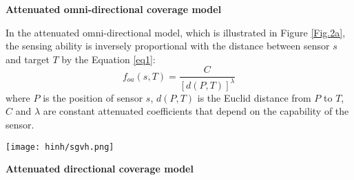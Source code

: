 \documentclass[final]{elsarticle}
\begin{document}
\noindent\textbf{Attenuated omni-directional coverage model}

In the attenuated omni-directional model, which is illustrated in Figure \ref{Fig.2a}, the sensing ability is inversely proportional with the distance between sensor $ s $ and target $ T $ by the Equation \ref{eq1}:
\begin{equation}
\label{eq1}
f_{oa}({s},T) = \frac{C}{{{{\left[ {d(P,T)} \right]}^\lambda }}}
\end{equation}
where $ P $ is the position of sensor $ s $, $ d(P,T) $ is the Euclid distance from $ P $ to $ T $, $ C $ and $ \lambda $ are constant attenuated coefficients that depend on the capability of the sensor. 
\begin{figure*}[h]
	\centering
	\texttt{[image: hinh/sgvh.png]}
	\caption{Attenuated sensing ability of an omni-directional sensor}
	\label{Fig.2a}       %
\end{figure*}

\noindent\textbf{Attenuated directional coverage model}
\end{document}
